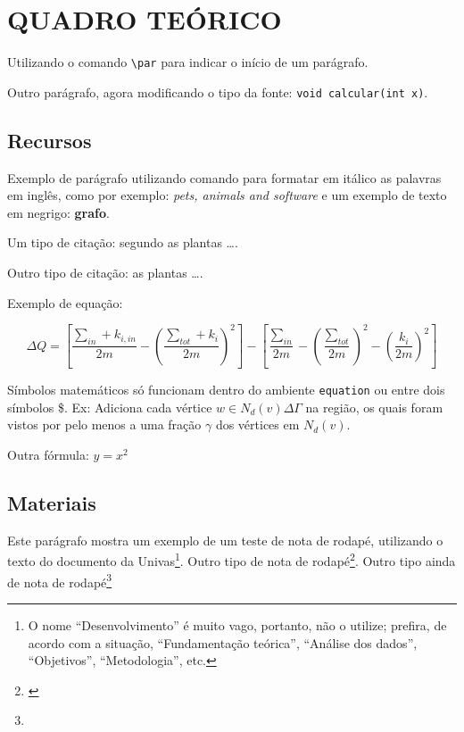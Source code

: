 
\chapter{QUADRO TEÓRICO}

\par Utilizando o comando \texttt{\textbackslash par} para indicar o início de um parágrafo.
\par Outro parágrafo, agora modificando o tipo da fonte: \texttt{void calcular(int x)}.

\section{Recursos}

\par Exemplo de parágrafo utilizando comando para formatar em itálico as palavras em inglês, como por exemplo: \textit{pets, animals and software} e um exemplo de texto em negrigo: \textbf{grafo}.

\par Um tipo de citação: segundo  as plantas \ldots.

\par Outro tipo de citação: as plantas \ldots \cite{correa2003plantas}.

\par Exemplo de equação:

\begin{equation}
 \Delta Q = 
 \left[
 \frac{\sum_{in} + k_{i,in}}{2m} - 
 \left(
 \frac{\sum_{tot} + k_i}{2m}
 \right)^2
 \right] -
 \left[
 \frac{\sum_{in}}{2m} - 
 \left(\frac{\sum_{tot}}{2m}
 \right)^2 - 
 \left(\frac{k_i}{2m}
 \right)^2
 \right]
\end{equation}


\par Símbolos matemáticos só funcionam dentro do ambiente \texttt{equation} ou entre dois símbolos \$. Ex: Adiciona cada vértice $w \in N_d(v) \Delta \Gamma$ na região, os quais foram vistos por pelo menos a uma fração $\gamma$ dos vértices em $N_d(v)$.

\par Outra fórmula: $y=x^2$

\section{Materiais}

\par Este parágrafo mostra um exemplo de um teste de nota de rodapé, utilizando o texto do documento da Univas\footnote{O nome “Desenvolvimento” é muito vago, portanto, não o utilize; prefira, de acordo com a situação, ``Fundamentação teórica'', ``Análise dos dados'', ``Objetivos'', ``Metodologia'', etc. }. Outro tipo de nota de rodapé\footnote{\cite{correa2003plantas}}.  Outro tipo ainda de nota de rodapé\footnote{}


